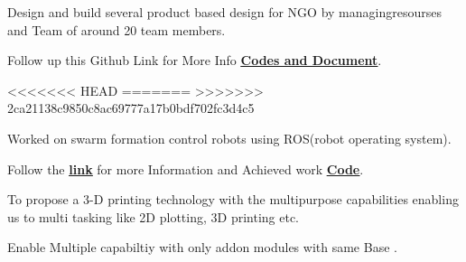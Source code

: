 \documentclass[]{font}
\begin{document}
\begin{minipage}[t]{0.69\textwidth}
\begin{tightemize}
\item Design and build several product based design for NGO by managingresourses and Team of around 20 team members.
\item Follow up this Github Link for More Info \textbf{\href{https://github.com/pranav083/Tinkering_project}{\underline{Codes and Document}}}.	
\end{tightemize}
\sectionsep

<<<<<<< HEAD
=======
>>>>>>> 2ca21138c9850c8ac69777a17b0bdf702fc3d4c5
\begin{tightemize}
\item Worked on swarm formation control robots using ROS(robot operating system).
\item Follow the \textbf{\href{http://crip.ml}{\underline{link}}} for more  Information and Achieved work \textbf{\href{https://github.com/pranav083/ROS_work_earlier_nrf}{\underline{Code}}}.	
\end{tightemize}
\sectionsep

\begin{tightemize}
\item To propose a 3-D printing technology with the multipurpose
capabilities enabling us to multi tasking like 2D plotting, 3D printing etc.
\item Enable Multiple capabiltiy with only addon modules with same Base .
\end{tightemize}
\sectionsep


\end{minipage}
\end{document}
